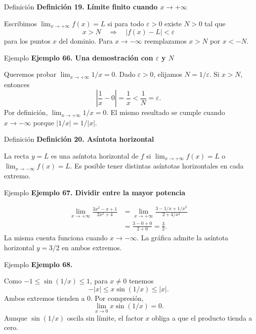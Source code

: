\documentclass[12pt,aspectratio=169]{beamer}
\begin{document}
\begin{frame}[t,allowframebreaks]{Definición}
{\color{azul}\bfseries Definición 19. Límite finito cuando $x\to+\infty$}\par\medskip

Escribimos $\lim_{x\to+\infty}f(x)=L$ si para todo $\varepsilon>0$ existe $N>0$ tal que
\[
 x>N\quad\Longrightarrow\quad|f(x)-L|<\varepsilon
\]
para los puntos $x$ del dominio. Para $x\to-\infty$ reemplazamos $x>N$ por $x<-N$.
\end{frame}


\begin{frame}[t,allowframebreaks]{Ejemplo}
{\color{azul}\bfseries Ejemplo 66. Una demostración con $\varepsilon$ y $N$}\par\medskip

Queremos probar $\lim_{x\to+\infty}1/x=0$. Dado $\varepsilon>0$, elijamos $N=1/\varepsilon$. Si $x>N$, entonces
\[
 \left|\frac1x-0\right|=\frac1x<\frac1N=\varepsilon.
\]
Por definición, $\boxed{\lim_{x\to+\infty}1/x=0}$. El mismo resultado se cumple cuando $x\to-\infty$ porque $|1/x|=1/|x|$.
\end{frame}


\begin{frame}[t,allowframebreaks]{Definición}
{\color{azul}\bfseries Definición 20. Asíntota horizontal}\par\medskip

La recta $y=L$ es una asíntota horizontal de $f$ si $\lim_{x\to+\infty}f(x)=L$ o $\lim_{x\to-\infty}f(x)=L$. Es posible tener distintas asíntotas horizontales en cada extremo.
\end{frame}


\begin{frame}[t,allowframebreaks]{Ejemplo}
{\color{azul}\bfseries Ejemplo 67. Dividir entre la mayor potencia}\par\medskip

\begin{align*}
\lim_{x\to+\infty}\frac{3x^2-x+1}{2x^2+4}
 &=\lim_{x\to+\infty}\frac{3-1/x+1/x^2}{2+4/x^2}\\
 &=\frac{3-0+0}{2+0}=\boxed{\frac32}.
\end{align*}
La misma cuenta funciona cuando $x\to-\infty$. La gráfica admite la asíntota horizontal $y=3/2$ en ambos extremos.
\end{frame}


\begin{frame}[t,allowframebreaks]{Ejemplo}
{\color{azul}\bfseries Ejemplo 68.}\par\medskip

Como $-1\le\sin(1/x)\le1$, para $x\ne0$ tenemos
\[
-|x|\le x\sin(1/x)\le|x|.
\]
Ambos extremos tienden a $0$. Por compresión,
\[
\boxed{\lim_{x\to0}x\sin(1/x)=0.}
\]
Aunque $\sin(1/x)$ oscila sin límite, el factor $x$ obliga a que el producto tienda a cero.
\end{frame}
\end{document}
